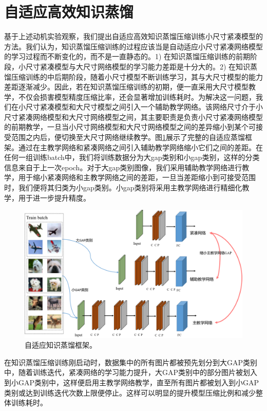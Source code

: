 \section{自适应高效知识蒸馏}
基于上述动机实验观察，我们提出自适应高效知识蒸馏压缩训练小尺寸紧凑模型的方法。我们认为，知识蒸馏压缩训练的过程应该当是自动适应小尺寸紧凑网络模型的学习过程而不断变化的，而不是一直静态的。1) 在知识蒸馏压缩训练的前期阶段，小尺寸紧凑模型与大尺寸网络模型的学习能力差距是十分大的。2) 在知识蒸馏压缩训练的中后期阶段，随着小尺寸模型不断训练学习，其与大尺寸模型的能力差距逐渐减少。因此，若在知识蒸馏压缩训练的初期，便一直采用大尺寸模型教学，不仅会损害模型精度压缩比率，还会显著增加训练耗时。为解决这一问题，我们在小尺寸紧凑模型和大尺寸模型之间引入一个辅助教学网络。该网络尺寸介于小尺寸紧凑网络模型和大尺寸网络模型之间，其主要职责是负责小尺寸紧凑网络模型的前期教学，一旦当小尺寸网络模型和大尺寸网络模型之间的差异缩小到某个可接受范围之内后，便切换至大尺寸网络继续教学。图\ref{frame}展示了完整的自适应蒸馏框架。通过在主教学网络和紧凑网络之间引入辅助教学网络缩小它们之间的差距。在任何一组训练batch中，我们将训练数据分为大gap类别和小gap类别，这样的分类信息来自于上一次epoch。对于大gap类别图像，我们采用辅助教学网络进行教学，用于缩小紧凑网络和主教学网络之间的差距，一旦当差距缩小到可接受范围时，我们便将其归类为小gap类别。小gap类别将采用主教学网络进行精细化教学，用于进一步提升精度。

\begin{figure}[ht]
	\centering
	\includegraphics[width=1\textwidth]{figures/adaptive_frame.png}
	\caption{自适应知识蒸馏框架。}
	\label{frame}
\end{figure}
在知识蒸馏压缩训练刚启动时，数据集中的所有图片都被预先划分到大GAP类别中，随着训练迭代，紧凑网络的学习能力提升，大GAP类别中的部分图片被划入到小GAP类别中，这样便启用主教学网络教学，直至所有图片都被划入到小GAP类别或达到训练迭代次数上限便停止。这样可以明显的提升模型压缩比例和减少整体训练耗时。

